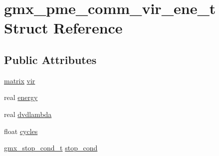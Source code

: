 \hypertarget{structgmx__pme__comm__vir__ene__t}{\section{gmx\-\_\-pme\-\_\-comm\-\_\-vir\-\_\-ene\-\_\-t \-Struct \-Reference}
\label{structgmx__pme__comm__vir__ene__t}
}
\subsection*{\-Public \-Attributes}
\begin{DoxyCompactItemize}
\item 
\hyperlink{share_2template_2gromacs_2types_2simple_8h_a7ea9c2a830d3f743b887387e33645a83}{matrix} \hyperlink{structgmx__pme__comm__vir__ene__t_a81a853ce717ef829bc211cb022b5fec8}{vir}
\item 
real \hyperlink{structgmx__pme__comm__vir__ene__t_a04009fce1c26209dd0ccb6a065fa8c8e}{energy}
\item 
real \hyperlink{structgmx__pme__comm__vir__ene__t_a4dfe0ab414c5ec9977bfe52a0030c18d}{dvdlambda}
\item 
float \hyperlink{structgmx__pme__comm__vir__ene__t_ad64d36c99724640438d44059c1f927ca}{cycles}
\item 
\hyperlink{include_2sighandler_8h_ab3c8210482f8a8f46ed9279749697932}{gmx\-\_\-stop\-\_\-cond\-\_\-t} \hyperlink{structgmx__pme__comm__vir__ene__t_ac44567e102a6c6022d822f263cda42dc}{stop\-\_\-cond}
\end{DoxyCompactItemize}


